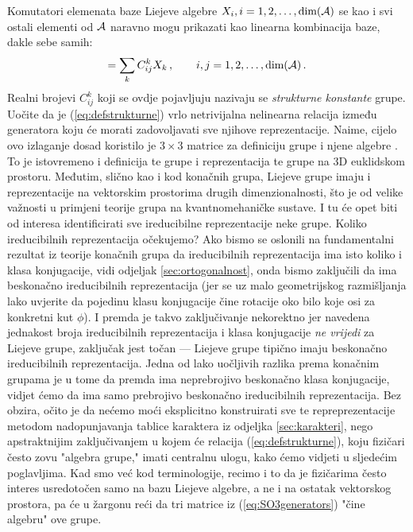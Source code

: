 Komutatori elemenata baze Liejeve algebre $X_i, i=1,2,\ldots, \textrm{dim}(\mathcal{A})$ se
kao i svi ostali elementi od $\mathcal{A}$ naravno mogu prikazati kao linearna kombinacija baze, dakle
sebe samih: 
\begin{equation}
 [X_i, X_j]= \sum_k C_{ij}^{k} X_k \,,  \qquad i,j=1,2,\ldots, \textrm{dim}(\calA) \,.
 \label{eq:defstrukturne}
\end{equation}
Realni brojevi $C_{ij}^{k}$ koji se ovdje pojavljuju nazivaju se \emph{strukturne konstante} grupe.
Uočite da je (\ref{eq:defstrukturne}) vrlo netrivijalna nelinearna relacija između
generatora koju će morati zadovoljavati sve njihove reprezentacije.  Naime, cijelo ovo
izlaganje dosad koristilo je $3\times 3$ matrice za definiciju grupe  i njene
algebre . To je istovremeno i definicija te grupe i reprezentacija te grupe 
na 3D euklidskom prostoru.
Međutim, slično kao i kod konačnih grupa, Liejeve grupe imaju i
reprezentacije na vektorskim prostorima drugih dimenzionalnosti, što je od velike
važnosti u primjeni teorije grupa na kvantnomehaničke sustave. I tu će opet biti od interesa
identificirati sve ireducibilne reprezentacije neke grupe. Koliko ireducibilnih
reprezentacija očekujemo? Ako bismo se oslonili na fundamentalni rezultat iz teorije
konačnih grupa da ireducibilnih reprezentacija ima isto koliko i klasa konjugacije,
vidi odjeljak \ref{sec:ortogonalnost}, onda bismo zaključili da  ima beskonačno
ireducibilnih reprezentacija (jer se uz malo geometrijskog razmišljanja lako uvjerite
da pojedinu klasu konjugacije čine rotacije oko bilo koje osi za konkretni kut $\phi$).
I premda je takvo zaključivanje nekorektno jer navedena jednakost broja ireducibilnih
reprezentacija i klasa konjugacije \emph{ne vrijedi} za Liejeve grupe, zaključak jest
točan --- Liejeve grupe tipično imaju beskonačno ireducibilnih reprezentacija.
Jedna od lako uočljivih razlika prema konačnim grupama je u tome da premda
 ima neprebrojivo beskonačno klasa konjugacije, vidjet ćemo da ima samo prebrojivo
beskonačno ireducibilnih reprezentacija.
Bez obzira, očito je da nećemo moći eksplicitno konstruirati sve te repreprezentacije
metodom nadopunjavanja tablice karaktera iz odjeljka \ref{sec:karakteri},
nego apstraktnijim zaključivanjem u kojem će
relacija (\ref{eq:defstrukturne}), koju fizičari često zovu "algebra grupe," imati
centralnu ulogu, kako ćemo vidjeti u sljedećim poglavljima.
Kad smo već kod terminologije, recimo i to da je fizičarima često interes usredotočen
samo na bazu Liejeve algebre, a ne i na ostatak vektorskog prostora, pa će u žargonu
reći da tri matrice iz (\ref{eq:SO3generators}) "čine algebru" ove grupe.



